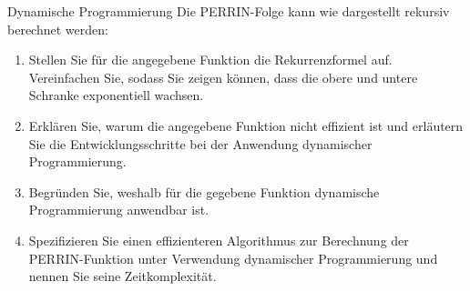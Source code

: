 \documentclass{article}
\begin{document}
\begin{exercise}{Dynamische Programmierung}
  Die PERRIN-Folge kann wie dargestellt rekursiv berechnet werden:\par
  
  \begin{enumerate}
    \item Stellen Sie für die angegebene Funktion die Rekurrenzformel auf. Vereinfachen Sie, sodass Sie zeigen können, dass die obere und untere Schranke exponentiell wachsen.
    \item Erklären Sie, warum die angegebene Funktion nicht effizient ist und erläutern Sie die Entwicklungsschritte bei der Anwendung dynamischer Programmierung.
    \item Begründen Sie, weshalb für die gegebene Funktion dynamische Programmierung anwendbar ist.
    \item Spezifizieren Sie einen effizienteren Algorithmus zur Berechnung der PERRIN-Funktion unter Verwendung dynamischer Programmierung und nennen Sie seine Zeitkomplexität.
  \end{enumerate}


\end{exercise}
\end{document}

